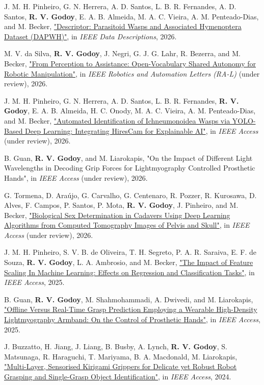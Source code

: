 \begin{cvparagraph}
J. M. H. Pinheiro, G. N. Herrera, A. D. Santos,
L. B. R. Fernandes, A. D. Santos, \textbf{R. V. Godoy}, E. A. B. Almeida, M. A. C. Vieira, A. M. Penteado-Dias, and
M. Becker, \href{https://ieeexplore.ieee.org/document/11483097}{"Descriptor: Parasitoid Wasps and Associated Hymenoptera Dataset (DAPWH)"}, in \textit{IEEE Data Descriptions}, 2026.

M. V. da Silva, \textbf{R. V. Godoy}, J. Negri, G. J. G. Lahr, R. Bezerra, and M. Becker, \href{https://perception-to-assistance.github.io}{"From Perception to Assistance: Open-Vocabulary Shared Autonomy for Robotic Manipulation"}, in \textit{IEEE Robotics and Automation Letters (RA-L)} (under review), 2026.


J. M. H. Pinheiro, G. N. Herrera, A. D. Santos,
L. B. R. Fernandes, \textbf{R. V. Godoy}, E. A. B. Almeida, H.
C. Onody, M. A. C. Vieira, A. M. Penteado-Dias, and
M. Becker, \href{https://arxiv.org/abs/2603.16351}{"Automated Identification of Ichneumonoidea Wasps via YOLO-Based
Deep Learning: Integrating HiresCam for Explainable AI"}, in \textit{IEEE Access} (under review), 2026.


B. Guan, \textbf{R. V. Godoy}, and M. Liarokapis, "On the Impact of Different Light Wavelengths in Decoding Grip Forces for Lightmyography Controlled Prosthetic Hands", in \textit{IEEE Access} (under review), 2026.

G. Tormena, D. Araújo, G. Carvalho, G. Centenaro, R. Pozzer, R. Kurosawa, D. Alves, F. Campos, P. Santos, P. Mota, \textbf{R. V. Godoy}, J. Pinheiro, and M. Becker, \href{https://arxiv.org/abs/2606.22515}{"Biological Sex Determination in Cadavers Using Deep Learning Algorithms from Computed Tomography Images of Pelvis and Skull"}, in \textit{IEEE Access} (under review), 2026.


J. M. H. Pinheiro, S. V. B. de Oliveira, T. H. Segreto, P. A. R. Saraiva, E. F. de Souza, \textbf{R. V. Godoy}, L. A. Ambrosio, and M. Becker, \href{https://ieeexplore.ieee.org/document/11261543}{"The Impact of Feature Scaling In Machine Learning: Effects on Regression and Classification Tasks"}, in \textit{IEEE Access}, 2025.


B. Guan, \textbf{R. V. Godoy}, M. Shahmohammadi, A. Dwivedi, and M. Liarokapis, \href{https://ieeexplore.ieee.org/abstract/document/10946889}{"Offline Versus Real-Time Grasp Prediction Employing a Wearable High-Density Lightmyography Armband: On the Control of Prosthetic Hands"}, in \textit{IEEE Access}, 2025.

J. Buzzatto, H. Jiang, J. Liang, B. Busby, A. Lynch, \textbf{R. V. Godoy}, S. Matsunaga, R. Haraguchi, T. Mariyama, B. A. Macdonald, M. Liarokapis, \href{https://ieeexplore.ieee.org/abstract/document/10639969/}{"Multi-Layer, Sensorised Kirigami Grippers for Delicate yet Robust Robot Grasping and Single-Grasp Object Identification"}, in \textit{IEEE Access}, 2024.


\end{cvparagraph}
